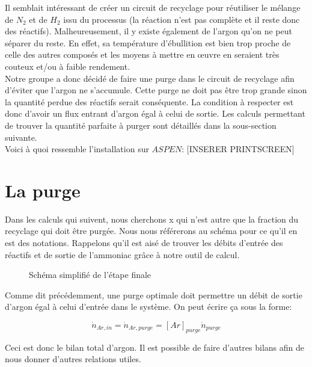 \documentclass[a4paper, oneside, 12pt]{article}
\begin{document}
Il semblait intéressant de créer un circuit de recyclage pour réutiliser le mélange de $N_2$ et de $H_2$ issu du processus (la réaction n'est pas complète et il reste donc des réactifs). Malheureusement, il y existe également de l'argon qu'on ne peut séparer du reste. En effet, sa température d'ébullition est bien trop proche de celle des autres composés et les moyens à mettre en œuvre en seraient très couteux et/ou à faible rendement. \\
Notre groupe a donc décidé de faire une purge dans le circuit de recyclage afin d'éviter que l'argon ne s'accumule. Cette purge ne doit pas être trop grande sinon la quantité perdue des réactifs serait conséquente. La condition à respecter est donc d'avoir un flux entrant d'argon égal à celui de sortie. Les calculs permettant de trouver la quantité parfaite à purger sont détaillés dans la sous-section suivante.\\
Voici à quoi ressemble l'installation sur $ASPEN$:
[INSERER PRINTSCREEN]

\section{La purge}

Dans les calculs qui suivent, nous cherchons x qui n'est autre que la fraction du recyclage qui doit être purgée. Nous nous référerons au schéma pour ce qu'il en est des notations. Rappelons qu'il est aisé de trouver les débits d'entrée des réactifs et de sortie de l'ammoniac grâce à notre outil de calcul.\\

\begin{figure}[h!]
	\begin{center}
		
	\end{center}
	\caption{Schéma simplifié de l'étape finale}
	\label{fig:schema}
\end{figure}

Comme dit précédemment, une purge optimale doit permettre un débit de sortie d'argon égal à celui d'entrée dans le système. On peut écrire ça sous la forme:

\begin{equation}
\dot{n}_{Ar,in}=\dot{n}_{Ar,purge}=[Ar]_{purge} \dot{n}_{purge}
\end{equation}

Ceci est donc le bilan total d'argon. Il est possible de faire d'autres bilans afin de nous donner d'autres relations utiles.\\
\end{document}

